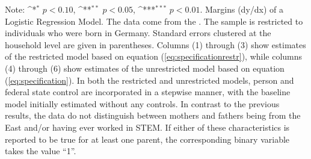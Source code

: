 \documentclass[a4paper, oneside, hyperfootnotes = false]{article}
\def\sym#1{\ifmmode^{#1}\else\(^{#1}\)\fi}
\begin{document}
{\begin{landscape}
\begin{table}[ht]
\begin{center}
			\vspace{2mm}
			
			\parbox{15cm}{
				\linespread{1}\footnotesize Note: \sym{*} \(p<0.10\), \sym{**} \(p<0.05\), \sym{***} \(p<0.01\). Margins (dy/dx) of a Logistic Regression Model. The data come from the \cite{SOEP2023}. The sample is restricted to individuals who were born in Germany. Standard errors clustered at the household level are given in parentheses. Columns (1) through (3) show estimates of the restricted model based on equation (\ref{eq:specificationrestr}), while columns (4) through (6) show estimates of the unrestricted model based on equation (\ref{eq:specification}). In both the restricted and unrestricted models, person and federal state control are incorporated in a stepwise manner, with the baseline model initially estimated without any controls. In contrast to the previous results, the data do not distinguish between mothers and fathers being from the East and/or having ever worked in STEM. If either of these characteristics is reported to be true for at least one parent, the corresponding binary variable takes the value ``1''.}
			
		\end{center}
	\end{table}
\end{landscape}

}
\end{document}
